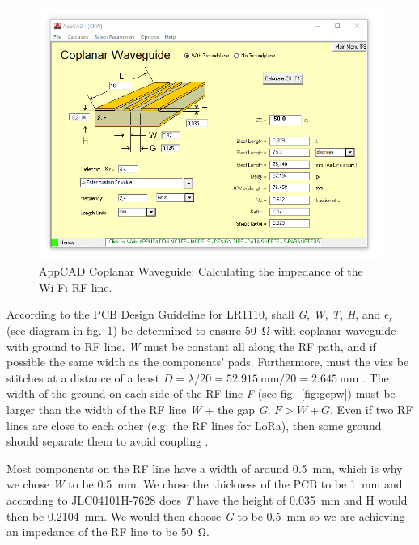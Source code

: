 \begin{figure}[H]
    \centering
    \includegraphics[width=1.0\textwidth]{figures/appcad_16.PNG}
    \caption{AppCAD Coplanar Waveguide: Calculating the impedance of the Wi-Fi RF line.}
    \label{fig:appcad}
\end{figure}

According to the PCB Design Guideline for LR1110, shall \textit{G}, \textit{W}, \textit{T}, \textit{H}, and $\epsilon_r$ (see diagram in fig.~\ref{fig:appcad}) be determined to ensure \SI{50}{\ohm} with coplanar waveguide with ground to \ac{RF} line. \textit{W} must be constant all along the \ac{RF} path, and if possible the same width as the components' pads. Furthermore, must the vias be stitches at a distance of a least $D = \lambda / 20 = \SI{52.915}{\milli\meter} / 20 = \SI{2.645}{\milli\meter}$ \cite[p.~9-11]{LR1110_pcb_design_guide}. The width of the ground on each side of the \ac{RF} line \textit{F} (see fig.~\ref{fig:gcpw}) must be larger than the width of the \ac{RF} line \textit{W} + the gap \textit{G}; $F > W + G$. Even if two \ac{RF} lines are close to each other (e.g. the \ac{RF} lines for \ac{LoRa}), then some ground should separate them to avoid coupling \cite[p.~20-21]{LR1110_pcb_design_guide}.

Most components on the \ac{RF} line have a width of around \SI{0.5}{\milli\meter}, which is why we chose \textit{W} to be \SI{0.5}{\milli\meter}. We chose the thickness of the \ac{PCB} to be \SI{1}{\milli\meter} and according to JLC04101H-7628 does \textit{T} have the height of \SI{0.035}{\milli\meter} and H would then be \SI{0.2104}{\milli\meter}. We would then choose \textit{G} to be \SI{0.5}{\milli\meter} so we are achieving an impedance of the RF line to be \SI{50}{\ohm}.

